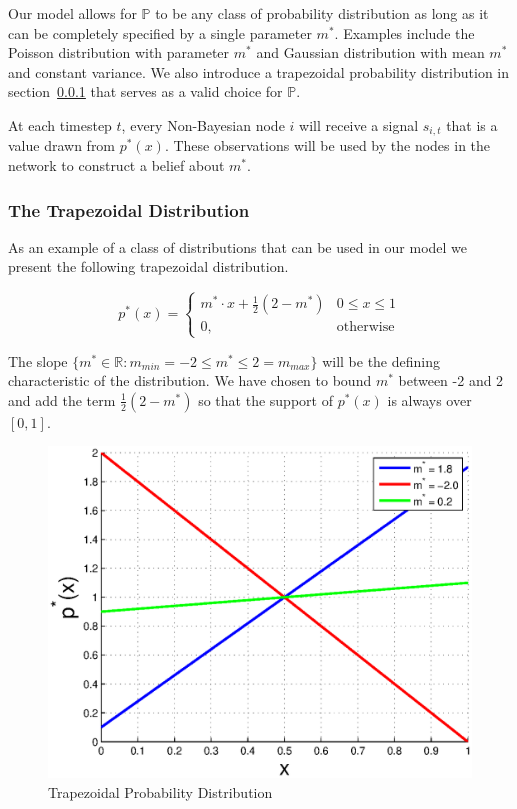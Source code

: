 \documentclass[a4paper,12pt]{article}
\begin{document}
Our model allows for $\mathbb{P}$ to be any class of probability distribution as long as it can be completely specified by a single parameter $m^*$.  Examples include the Poisson distribution with parameter $m^*$ and Gaussian distribution with mean $m^*$ and constant variance.  We also introduce a trapezoidal probability distribution in section~\ref{sec:trapezoidal_distribution} that serves as a valid choice for $\mathbb{P}$.

At each timestep $t$, every Non-Bayesian node $i$ will receive a signal $s_{i,t}$ that is a value drawn from $p^*(x)$.  These observations will be used by the nodes in the network to construct a belief about $m^*$.

\subsubsection{The Trapezoidal Distribution}
\label{sec:trapezoidal_distribution}

As an example of a class of distributions that can be used in our model we present the following trapezoidal distribution.

\begin{equation}
p^*(x)=\begin{cases}
m^* \cdot x + \frac{1}{2}(2-m^*) & 0 \le x \le 1 \\
0, & \text{otherwise}
\end{cases}
\end{equation}

The slope $\{ m^* \in \mathbb{R} : m_{min} = -2 \le m^* \le 2 = m_{max} \}$ will be the defining characteristic of the distribution.  We have chosen to bound $m^*$ between -2 and 2 and add the term $\frac{1}{2}(2-m^*)$ so that the support of $p^*(x)$  is always over $[0,1]$.

\begin{figure}[h]
\centering
\includegraphics[scale=0.8]{trapezoidalDistribution.eps}
\caption{Trapezoidal Probability Distribution}
\end{figure}
\end{document}
